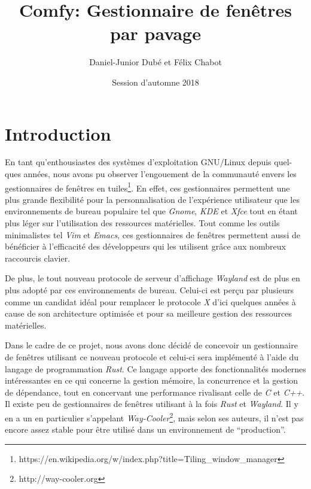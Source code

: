 \documentclass[titlepage]{article}
\title{Comfy: Gestionnaire de fenêtres par pavage}
\author{Daniel-Junior Dubé et Félix Chabot}
\date{Session d'automne 2018}
\begin{document}
\maketitle

\renewcommand{\contentsname}{Table des matières}
\tableofcontents
\newpage

\section{Introduction}
\par
En tant qu'enthousiastes des systèmes d'exploitation GNU/Linux depuis quel-ques
années, nous avons pu observer l’engouement de la communauté envers les
gestionnaires de fenêtres en
tuiles\footnote{https://en.wikipedia.org/w/index.php?title=Tiling\_window\_manager}.
En effet, ces gestionnaires permettent une plus grande flexibilité pour la
personnalisation de l’expérience utilisateur que les environnements de bureau
populaire tel que \textit{Gnome}, \textit{KDE} et \textit{Xfce} tout en étant
plus léger sur l’utilisation des ressources matérielles. Tout comme les outils
minimalistes tel \textit{Vim} et \textit{Emacs}, ces gestionnaires de fenêtres
permettent aussi de bénéficier à l’efficacité des développeurs qui les utilisent
grâce aux nombreux raccourcis clavier.
\bigskip

\par
De plus, le tout nouveau protocole de serveur d'affichage \textit{Wayland} est
de plus en plus adopté par ces environnements de bureau. Celui-ci est perçu par
plusieurs comme un candidat idéal pour remplacer le protocole \textit{X} d'ici
quelques années à cause de son architecture optimisée et pour sa meilleure
gestion des ressources matérielles.
\bigskip

\par
Dans le cadre de ce projet, nous avons donc décidé de concevoir un gestionnaire
de fenêtres utilisant ce nouveau protocole et celui-ci sera implémenté à l'aide
du langage de programmation \textit{Rust}. Ce langage apporte des
fonctionnalités modernes intéressantes en ce qui concerne la gestion mémoire, la
concurrence et la gestion de dépendance, tout en concervant une performance
rivalisant celle de \textit{C} et \textit{C++}. Il existe peu de gestionnaires
de fenêtres utilisant à la fois \textit{Rust} et \textit{Wayland}. Il y en a un
en particulier s’appelant \textit{Way-Cooler}\footnote{http://way-cooler.org},
mais selon ses auteurs, il n’est pas encore assez stable pour être
utilisé dans un environnement de “production”.
\bigskip
\end{document}
